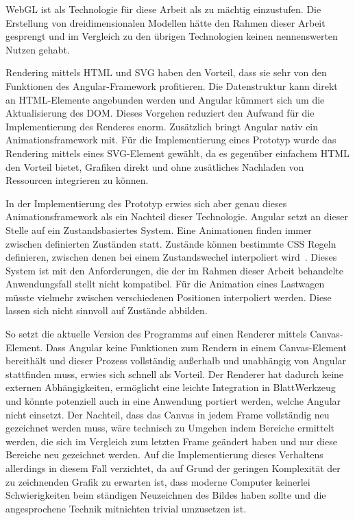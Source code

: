WebGL ist als Technologie für diese Arbeit als zu mächtig einzustufen. Die Erstellung von dreidimensionalen Modellen hätte den Rahmen dieser Arbeit gesprengt und im Vergleich zu den übrigen Technologien keinen nennenswerten Nutzen gehabt.

Rendering mittels HTML und SVG haben den Vorteil, dass sie sehr von den Funktionen des Angular-Framework profitieren. Die Datenstruktur kann direkt an HTML-Elemente angebunden werden und Angular kümmert sich um die Aktualisierung des DOM. Dieses Vorgehen reduziert den Aufwand für die Implementierung des Renderes enorm. Zusätzlich bringt Angular nativ ein Animationsframework mit. Für die Implementierung eines Prototyp wurde das Rendering mittels eines SVG-Element gewählt, da es gegenüber einfachem HTML den Vorteil bietet, Grafiken direkt und ohne zusätliches Nachladen von Ressourcen integrieren zu können.

In der Implementierung des Prototyp erwies sich aber genau dieses Animationsframework als ein Nachteil dieser Technologie. Angular setzt an dieser Stelle auf ein Zustandsbasiertes System. Eine Animationen finden immer zwischen definierten Zuständen statt. Zustände können bestimmte CSS Regeln definieren, zwischen denen bei einem Zustandswechel interpoliert wird~\cite{angular-animations}. Dieses System ist mit den Anforderungen, die der im Rahmen dieser Arbeit behandelte Anwendungsfall stellt nicht kompatibel. Für die Animation eines Lastwagen müsste vielmehr zwischen verschiedenen Positionen interpoliert werden. Diese lassen sich nicht sinnvoll auf Zustände abbilden.

So setzt die aktuelle Version des Programms auf einen Renderer mittels Canvas-Element. Dass Angular keine Funktionen zum Rendern in einem Canvas-Element bereithält und dieser Prozess vollständig außerhalb und unabhängig von Angular stattfinden muss, erwies sich schnell als Vorteil. Der Renderer hat dadurch keine externen Abhängigkeiten, ermöglicht eine leichte Integration in BlattWerkzeug und könnte potenziell auch in eine Anwendung portiert werden, welche Angular nicht einsetzt. Der Nachteil, dass das Canvas in jedem Frame vollständig neu gezeichnet werden muss, wäre technisch zu Umgehen indem Bereiche ermittelt werden, die sich im Vergleich zum letzten Frame geändert haben und nur diese Bereiche neu gezeichnet werden. Auf die Implementierung dieses Verhaltens allerdings in diesem Fall verzichtet, da auf Grund der geringen Komplexität der zu zeichnenden Grafik zu erwarten ist, dass moderne Computer keinerlei Schwierigkeiten beim ständigen Neuzeichnen des Bildes haben sollte und die angesprochene Technik mitnichten trivial umzusetzen ist.

